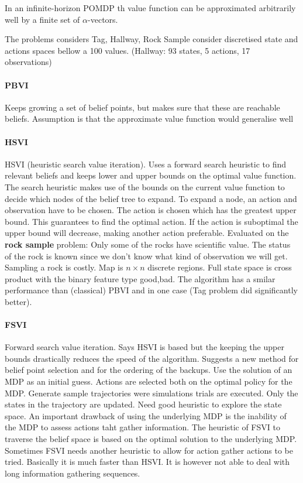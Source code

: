 \documentclass[review]{elsarticle}
\begin{document}
In an infinite-horizon POMDP th value function can be approximated arbitrarily well by a finite set of $\alpha$-vectors.

The problems considers Tag, Hallway, Rock Sample consider discretised state and actions spaces bellow a 100 values.
(Hallway: 93 states, 5 actions, 17 observations)

\paragraph{PBVI}
Keeps growing a set of belief points, but makes sure that these are reachable beliefs. Assumption is that the approximate value function
would generalise well 

\paragraph{HSVI}
HSVI (heuristic search value iteration). Uses a forward search heuristic to find relevant beliefs and keeps lower and upper bounds on the 
optimal value function. The search heuristic makes use of the bounds on the current value function to decide which nodes of the belief tree to 
expand. To expand a node, an action and observation have to be chosen. The action is chosen which has the greatest upper bound. This
guarantees to find the optimal action. If the action is suboptimal the upper bound will decrease, making another action preferable.
Evaluated on the \textbf{rock sample} problem: Only some of the rocks have scientific value. The status of the rock is known since
we don't know what kind of observation we will get. Sampling a rock is costly. Map is $n \times n$ discrete regions. Full state space
is cross product with the binary feature type {good,bad}. The algorithm has a smilar performance than (classical) PBVI and in one 
case (Tag problem did significantly better).

\paragraph{FSVI}
Forward search value iteration. Says HSVI is based but the keeping the upper bounds drastically reduces the speed of the algorithm. 
Suggests a new method for belief point selection and for the ordering of the backups. Use the solution of an MDP as an initial 
guess. Actions are selected both on the optimal policy for the MDP. Generate sample trajectories were simulations trials are executed.
Only the states in the trajectory are updated. Need good heuristic to explore the state space. An important drawback of using the underlying
MDP is the inability of the MDP to assess actions taht gather information. The heuristic of FSVI to traverse the belief space is based on 
the optimal solution to the underlying MDP. Sometimes FSVI needs another heuristic to allow for action gather actions to be tried.
Basically it is much faster than HSVI. It is however not able to deal with long information gathering sequences.
\end{document}
